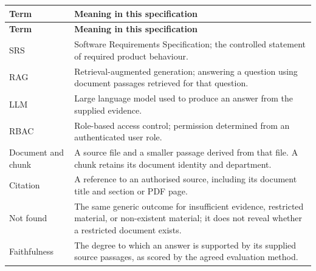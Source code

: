 \documentclass[11pt,letterpaper]{article}
\begin{document}
\begingroup\small

\begin{longtable}{|P{\arrayrulewidth\relax}|P{\arrayrulewidth\relax}|}

\hline{}

\textbf{Term} & \textbf{Meaning in this specification} \\ \hline

\endfirsthead

\hline{}

\textbf{Term} & \textbf{Meaning in this specification} \\ \hline

\endhead

\hline\endfoot

\hline\endlastfoot

SRS & Software Requirements Specification; the controlled statement of required product behaviour. \\ \hline

RAG & Retrieval-augmented generation; answering a question using document passages retrieved for that question. \\ \hline

LLM & Large language model used to produce an answer from the supplied evidence. \\ \hline

RBAC & Role-based access control; permission determined from an authenticated user role. \\ \hline

Document and chunk & A source file and a smaller passage derived from that file. A chunk retains its document identity and department. \\ \hline

Citation & A reference to an authorised source, including its document title and section or PDF page. \\ \hline

Not found & The same generic outcome for insufficient evidence, restricted material, or non-existent material; it does not reveal whether a restricted document exists. \\ \hline

Faithfulness & The degree to which an answer is supported by its supplied source passages, as scored by the agreed evaluation method. \\ \hline


\end{longtable}
\end{document}
